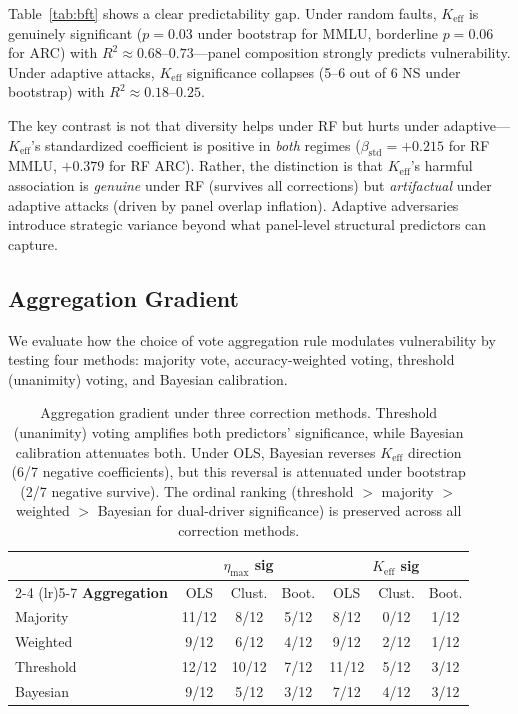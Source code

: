 \documentclass[11pt,a4paper]{article}
\newcommand{\etamax}{\ensuremath{\eta_{\max}}}
\newcommand{\keff}{\ensuremath{K_{\text{eff}}}}
\begin{document}
Table~\ref{tab:bft} shows a clear predictability gap.
Under random faults, $\keff$ is genuinely significant ($p=0.03$ under bootstrap for MMLU, borderline $p=0.06$ for ARC) with $R^2\approx 0.68$--$0.73$---panel composition strongly predicts vulnerability.
Under adaptive attacks, $\keff$ significance collapses (5--6 out of 6 NS under bootstrap) with $R^2\approx 0.18$--$0.25$.

The key contrast is not that diversity helps under RF but hurts under adaptive---$\keff$'s standardized coefficient is positive in \emph{both} regimes ($\beta_\text{std}=+0.215$ for RF MMLU, $+0.379$ for RF ARC).
Rather, the distinction is that $\keff$'s harmful association is \emph{genuine} under RF (survives all corrections) but \emph{artifactual} under adaptive attacks (driven by panel overlap inflation).
Adaptive adversaries introduce strategic variance beyond what panel-level structural predictors can capture.

\subsection{Aggregation Gradient}
\label{sec:aggregation}

We evaluate how the choice of vote aggregation rule modulates vulnerability by testing four methods: majority vote, accuracy-weighted voting, threshold (unanimity) voting, and Bayesian calibration.

\begin{table}[t]
\centering
\small
\setlength{\tabcolsep}{3pt}
\begin{tabular}{l ccc ccc}
\toprule
& \multicolumn{3}{c}{\textbf{$\etamax$ sig}} & \multicolumn{3}{c}{\textbf{$\keff$ sig}} \\
\cmidrule(lr){2-4} \cmidrule(lr){5-7}
\textbf{Aggregation} & OLS & Clust. & Boot. & OLS & Clust. & Boot. \\
\midrule
Majority & 11/12 & 8/12 & 5/12 & 8/12 & 0/12 & 1/12 \\
Weighted & 9/12 & 6/12 & 4/12 & 9/12 & 2/12 & 1/12 \\
Threshold & 12/12 & 10/12 & 7/12 & 11/12 & 5/12 & 3/12 \\
Bayesian & 9/12 & 5/12 & 3/12 & 7/12 & 4/12 & 3/12 \\
\bottomrule
\end{tabular}
\caption{Aggregation gradient under three correction methods.
Threshold (unanimity) voting amplifies both predictors' significance, while Bayesian calibration attenuates both.
Under OLS, Bayesian reverses $\keff$ direction (6/7 negative coefficients), but this reversal is attenuated under bootstrap (2/7 negative survive).
The ordinal ranking (threshold $>$ majority $>$ weighted $>$ Bayesian for dual-driver significance) is preserved across all correction methods.}
\label{tab:aggregation}
\end{table}
\end{document}
